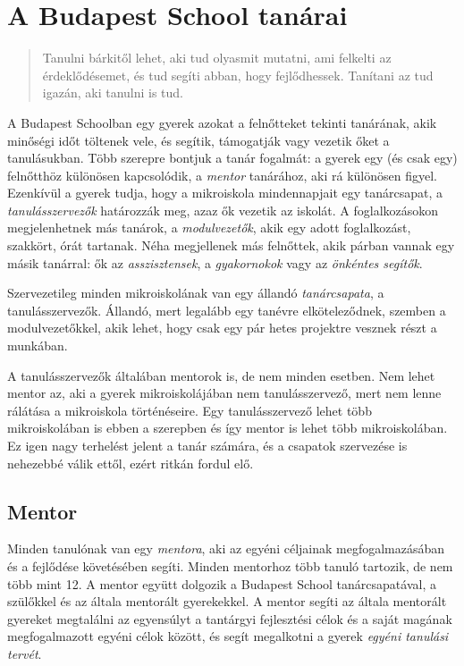  \section{A Budapest School tanárai}
  \begin{quote}

    Tanulni bárkitől lehet, aki tud olyasmit mutatni, ami felkelti az
    érdeklődésemet, és tud segíti abban, hogy fejlődhessek. Tanítani az tud igazán, aki tanulni is tud.
\end{quote}
A Budapest Schoolban egy gyerek azokat a felnőtteket tekinti tanárának, akik minőségi időt töltenek vele, és segítik, támogatják vagy vezetik őket a tanulásukban. Több szerepre bontjuk a tanár fogalmát: a gyerek egy (és csak egy) felnőtthöz különösen kapcsolódik, a \emph{mentor} tanárához, aki rá különösen figyel. Ezenkívül a gyerek tudja, hogy a mikroiskola mindennapjait egy tanárcsapat, a \emph{tanulásszervezők} határozzák meg, azaz ők vezetik az iskolát.  A foglalkozásokon megjelenhetnek más tanárok, a \emph{modulvezetők}, akik egy adott foglalkozást, szakkört, órát tartanak. Néha megjellenek más felnőttek, akik párban vannak egy másik tanárral: ők az \emph{asszisztensek}, a \emph{gyakornokok} vagy az \emph{önkéntes segítők}.

Szervezetileg minden mikroiskolának van egy állandó \emph{tanárcsapata}, a tanulásszervezők. Állandó, mert legalább egy tanévre elköteleződnek, szemben a modulvezetőkkel, akik lehet, hogy csak egy pár hetes projektre vesznek részt a munkában.

A tanulásszervezők általában mentorok is, de nem minden esetben. Nem lehet mentor az, aki a gyerek mikroiskolájában nem tanulásszervező, mert nem lenne rálátása a mikroiskola történéseire. Egy tanulásszervező lehet több mikroiskolában is ebben a szerepben és így mentor is lehet több mikroiskolában. Ez igen nagy terhelést jelent a tanár számára, és a csapatok szervezése is nehezebbé válik ettől, ezért ritkán fordul elő.



\subsection{Mentor}
  Minden tanulónak van egy \emph{mentora}, aki az egyéni céljainak megfogalmazásában és
  a fejlődése követésében segíti. Minden mentorhoz több tanuló tartozik, de nem
  több mint 12. A mentor együtt dolgozik a Budapest School tanárcsapatával, a
  szülőkkel és az általa mentorált gyerekekkel. A mentor segíti az általa
  mentorált gyereket megtalálni az egyensúlyt a tantárgyi fejlesztési célok és a
  saját magának megfogalmazott egyéni célok között, és segít megalkotni a gyerek \emph{egyéni
  tanulási tervét}.

